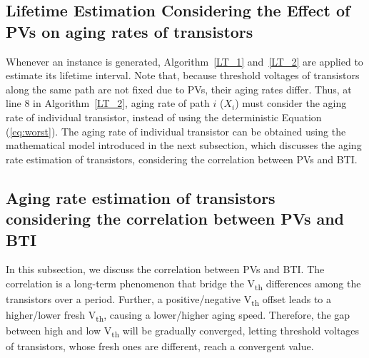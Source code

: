 \subsection{Lifetime Estimation Considering the Effect of PVs on aging rates of transistors}
\label{sec:ins:lt}
Whenever an instance is generated, Algorithm~\ref{LT_1} and~\ref{LT_2} are applied to estimate its lifetime interval. Note that, because threshold voltages of transistors along the same path are not fixed due to PVs, their aging rates differ. Thus, at line 8 in Algorithm~\ref{LT_2}, aging rate of path $i$ ($X_{i}$) must consider the aging rate of individual transistor, instead of using the deterministic Equation (\ref{eq:worst}). The aging rate of individual transistor can be obtained using the mathematical model introduced in the next subsection, which discusses the aging rate estimation of transistors, considering the correlation between PVs and BTI.%

\subsection{Aging rate estimation of transistors considering the correlation between PVs and BTI}
\label{sec:ins:cor}
In this subsection, we discuss the correlation between PVs and BTI. The correlation is a long-term phenomenon that bridge the V\textsubscript{th} differences among the transistors over a period. Further, a positive/negative V\textsubscript{th} offset leads to a higher/lower fresh V\textsubscript{th}, causing a lower/higher aging speed. Therefore, the gap between high and low V\textsubscript{th} will be gradually converged, letting threshold voltages of transistors, whose fresh ones are different, reach a convergent value.

